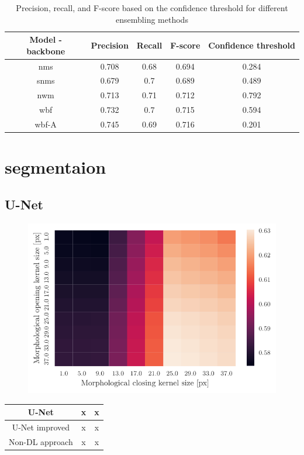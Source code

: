 \begin{table}
    \begin{tabular}{c||c|c|c|c}
        Model - backbone & Precision & Recall & F-score & Confidence threshold \\ \hline \hline
        nms              & 0.708     & 0.68   & 0.694   & 0.284                \\ \hline
        snms             & 0.679     & 0.7    & 0.689   & 0.489                \\ \hline
        nwm              & 0.713     & 0.71   & 0.712   & 0.792                \\ \hline
        wbf              & 0.732     & 0.7    & 0.715   & 0.594                \\ \hline
        wbf-A            & 0.745     & 0.69   & 0.716   & 0.201                \\ \hline
    \end{tabular}
    \caption{Precision, recall, and F-score based on the confidence threshold for different ensembling methods}
    \label{tab:ensembling_prf}
\end{table}

\section{segmentaion}
\subsection{U-Net}

\begin{figure}
    \centering
    \includegraphics[]{images/heatmap_of_unetpostproc_search.pdf}
\end{figure}

\begin{table}
    \centering
    \begin{tabular}{c|c|c}
        U-Net           & x & x \\ \hline
        U-Net improved  & x & x \\ \hline
        Non-DL approach & x & x \\
    \end{tabular}
\end{table}
